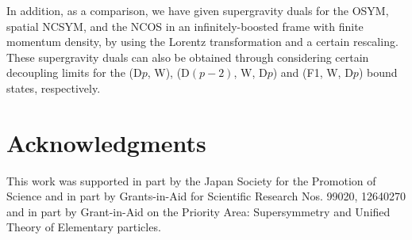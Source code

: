 \documentclass[a4paper,12pt]{article}
\begin{document}
In addition, as a comparison, we have given supergravity duals for
the OSYM, spatial NCSYM, and the NCOS in an
infinitely-boosted frame with finite momentum density, by using the
Lorentz transformation and a certain rescaling. These supergravity
duals can also be obtained through considering certain decoupling limits
for the (D$p$, W), (D$(p-2)$, W, D$p$) and (F1, W, D$p$) bound states,
respectively.


\section*{Acknowledgments}


This work was supported in part by the Japan Society for the Promotion of
Science and in part by Grants-in-Aid for Scientific Research
Nos. 99020, 12640270 and in part by Grant-in-Aid on the Priority Area:
Supersymmetry and Unified Theory of Elementary particles.
\end{document}
